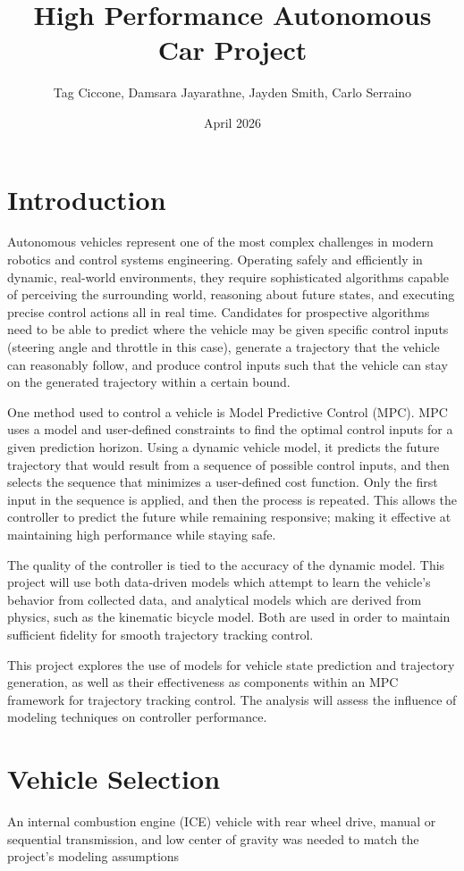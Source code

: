 \documentclass{article}
\title{High Performance Autonomous Car Project}
\author{Tag Ciccone, Damsara Jayarathne, Jayden Smith, Carlo Serraino}
\date{April 2026}
\begin{document}
\maketitle

\section{Introduction}
Autonomous vehicles represent one of the most complex challenges in modern robotics and control systems engineering. Operating safely and efficiently in dynamic, real-world environments, they require sophisticated algorithms capable of perceiving the surrounding world, reasoning about future states, and executing precise control actions all in real time. Candidates for prospective algorithms need to be able to predict where the vehicle may be given specific control inputs (steering angle and throttle in this case), generate a trajectory that the vehicle can reasonably follow, and produce control inputs such that the vehicle can stay on the generated trajectory within a certain bound.

One method used to control a vehicle is Model Predictive Control (MPC). MPC uses a model and user-defined constraints to find the optimal control inputs for a given prediction horizon. Using a dynamic vehicle model, it predicts the future trajectory that would result from a sequence of possible control inputs, and then selects the sequence that minimizes a user-defined cost function. Only the first input in the sequence is applied, and then the process is repeated. This allows the controller to predict the future while remaining responsive; making it effective at maintaining high performance while staying safe.

The quality of the controller is tied to the accuracy of the dynamic model. This project will use both data-driven models which attempt to learn the vehicle's behavior from collected data, and analytical models which are derived from physics, such as the kinematic bicycle model. Both are used in order to maintain sufficient fidelity for smooth trajectory tracking control.

This project explores the use of models for vehicle state prediction and trajectory generation, as well as their effectiveness as components within an MPC framework for trajectory tracking control. The analysis will assess the influence of modeling techniques on controller performance.

\section{Vehicle Selection}
An internal combustion engine (ICE) vehicle with rear wheel drive, manual or sequential transmission, and low center of gravity was needed to match the project's modeling assumptions
\end{document}
